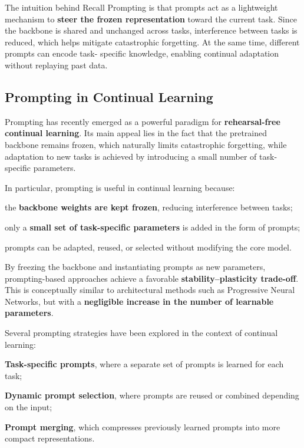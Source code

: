 The intuition behind Recall Prompting is that prompts act as a lightweight mechanism to
\textbf{steer the frozen representation} toward the current task. Since the backbone is
shared and unchanged across tasks, interference between tasks is reduced, which helps
mitigate catastrophic forgetting. At the same time, different prompts can encode task-
specific knowledge, enabling continual adaptation without replaying past data.

\subsection{Prompting in Continual Learning}

Prompting has recently emerged as a powerful paradigm for \textbf{rehearsal-free continual
learning}. Its main appeal lies in the fact that the pretrained backbone remains frozen,
which naturally limits catastrophic forgetting, while adaptation to new tasks is achieved
by introducing a small number of task-specific parameters.

In particular, prompting is useful in continual learning because:
\begin{compactitemize}
    \item the \textbf{backbone weights are kept frozen}, reducing interference between tasks;
    \item only a \textbf{small set of task-specific parameters} is added in the form of
    prompts;
    \item prompts can be adapted, reused, or selected without modifying the core model.
\end{compactitemize}

By freezing the backbone and instantiating prompts as new parameters, prompting-based
approaches achieve a favorable \textbf{stability--plasticity trade-off}. This is conceptually
similar to architectural methods such as Progressive Neural Networks, but with a
\textbf{negligible increase in the number of learnable parameters}.

Several prompting strategies have been explored in the context of continual learning:
\begin{compactitemize}
    \item \textbf{Task-specific prompts}, where a separate set of prompts is learned for
    each task;
    \item \textbf{Dynamic prompt selection}, where prompts are reused or combined depending
    on the input;
    \item \textbf{Prompt merging}, which compresses previously learned prompts into more
    compact representations.
\end{compactitemize}

